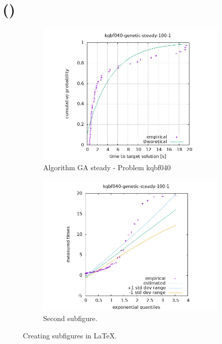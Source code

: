 \section{\tttfull (\ttt)}

\begin{figure}[H]
    \centering
    \begin{subfigure}{0.49\textwidth}
        \includegraphics[width=\textwidth]{figure/ttt_plot/kqbf040-genetic-steady-100-1-exp.jpeg}
        \caption{Algorithm GA steady - Problem kqbf040}
        \label{fig:ga-steady-kqbf040-exp}
    \end{subfigure}
    \hfill
    \begin{subfigure}{0.49\textwidth}
        \includegraphics[width=\textwidth]{figure/ttt_plot/kqbf040-genetic-steady-100-1-qq.jpeg}
        \caption{Second subfigure.}
        \label{fig:ga-steady-kqbf040-qq}
    \end{subfigure}
    \caption{Creating subfigures in \LaTeX.}
    \label{fig:ga-steady-kqbf040}
\end{figure}


